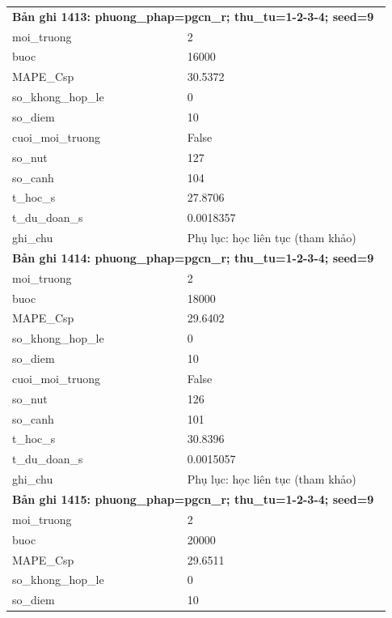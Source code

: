\begin{longtable}{p{0.43\linewidth}p{0.50\linewidth}}
\midrule
\multicolumn{2}{p{0.95\linewidth}}{\textbf{Bản ghi 1413: phuong\_phap=pgcn\_r; thu\_tu=1-2-3-4; seed=9}} \\
moi\_\allowbreak truong & 2 \\
buoc & 16000 \\
MAPE\_\allowbreak Csp & 30.5372 \\
so\_\allowbreak khong\_\allowbreak hop\_\allowbreak le & 0 \\
so\_\allowbreak diem & 10 \\
cuoi\_\allowbreak moi\_\allowbreak truong & False \\
so\_\allowbreak nut & 127 \\
so\_\allowbreak canh & 104 \\
t\_\allowbreak hoc\_\allowbreak s & 27.8706 \\
t\_\allowbreak du\_\allowbreak doan\_\allowbreak s & 0.0018357 \\
ghi\_\allowbreak chu & Phụ lục: học liên tục (tham khảo) \\
\midrule
\multicolumn{2}{p{0.95\linewidth}}{\textbf{Bản ghi 1414: phuong\_phap=pgcn\_r; thu\_tu=1-2-3-4; seed=9}} \\
moi\_\allowbreak truong & 2 \\
buoc & 18000 \\
MAPE\_\allowbreak Csp & 29.6402 \\
so\_\allowbreak khong\_\allowbreak hop\_\allowbreak le & 0 \\
so\_\allowbreak diem & 10 \\
cuoi\_\allowbreak moi\_\allowbreak truong & False \\
so\_\allowbreak nut & 126 \\
so\_\allowbreak canh & 101 \\
t\_\allowbreak hoc\_\allowbreak s & 30.8396 \\
t\_\allowbreak du\_\allowbreak doan\_\allowbreak s & 0.0015057 \\
ghi\_\allowbreak chu & Phụ lục: học liên tục (tham khảo) \\
\midrule
\multicolumn{2}{p{0.95\linewidth}}{\textbf{Bản ghi 1415: phuong\_phap=pgcn\_r; thu\_tu=1-2-3-4; seed=9}} \\
moi\_\allowbreak truong & 2 \\
buoc & 20000 \\
MAPE\_\allowbreak Csp & 29.6511 \\
so\_\allowbreak khong\_\allowbreak hop\_\allowbreak le & 0 \\
so\_\allowbreak diem & 10 \\

\end{longtable}
